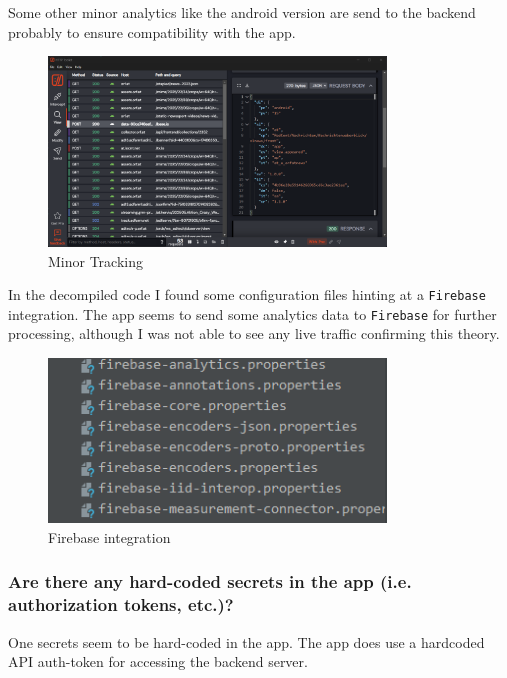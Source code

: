 \documentclass[12pt,a4paper]{article}
\begin{document}
Some other minor analytics like the android version are send to the backend probably to ensure compatibility with the app.

\begin{figure}[H]
\centering
\includegraphics[width=0.8\textwidth]{./screenshots/minor_tracking.png}
\caption{Minor Tracking}
\end{figure}

In the decompiled code I found some configuration files hinting at a \texttt{Firebase} integration. 
The app seems to send some analytics data to \texttt{Firebase} for further processing, although I was not able to see any live traffic confirming this theory.

\begin{figure}[H]
\centering
\includegraphics[width=0.8\textwidth]{./screenshots/Firebase_integration.png}
\caption{Firebase integration}
\end{figure}
 
\subsubsection{Are there any hard-coded secrets in the app (i.e. authorization tokens, etc.)?}

One secrets seem to be hard-coded in the app. The app does use a hardcoded API auth-token for accessing the backend server.
\end{document}
